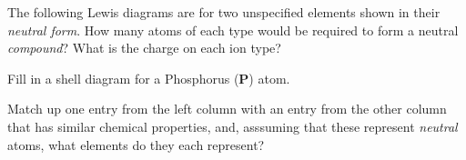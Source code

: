 \documentclass[addpoints, 12pt]{exam}
\begin{document}
\begin{questions}
\question[10]
The following Lewis diagrams are for two unspecified elements shown in
their \emph{neutral form}.  How many atoms of each type would be
required to form a neutral \emph{compound}?  What is the charge on
each ion type? 

\vspace{1cm}

\question[10]  Fill in a shell diagram for a Phosphorus (\textbf{P}) atom.
\vspace{1cm}

\question[5] Match up one entry from the left column with an entry from the other
  column that has similar chemical properties, and, asssuming that
  these represent \emph{neutral} atoms, what elements do they each represent?


\end{questions}
\end{document}
